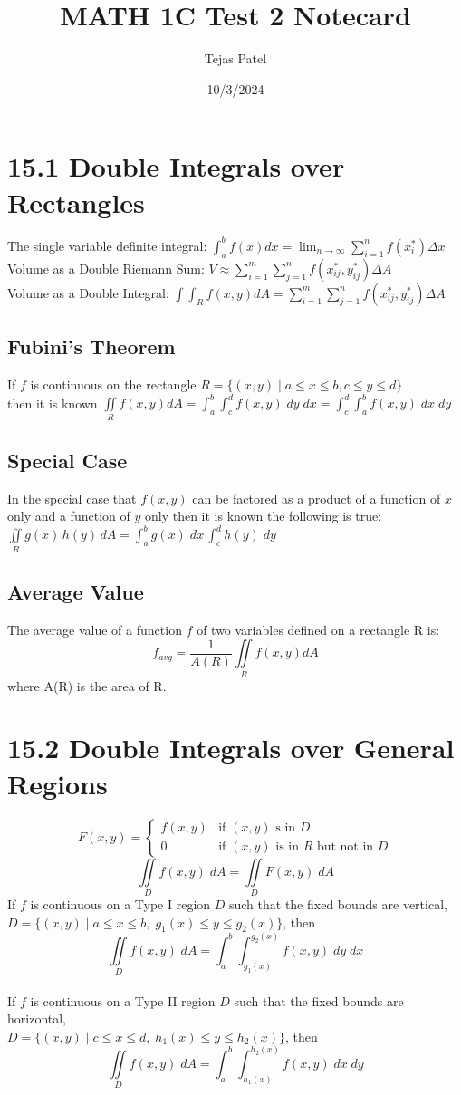 \documentclass{article}
\title{MATH 1C Test 2 Notecard}
\date{10/3/2024}
\author{Tejas Patel}
\begin{document}
\maketitle
\section*{15.1 Double Integrals over Rectangles}
The single variable definite integral: $\int_{a}^{b} f(x) dx = \lim_{n\to\infty} \sum_{i=1}^{n} f(x^*_i) \Delta x$
\\ Volume as a Double Riemann Sum: $V \approx \sum_{i=1}^{m}\sum_{j=1}^{n} f(x^*_{ij}, y^*_{ij}) \Delta A$
\\ Volume as a Double Integral: $\int\int_{R}f(x,y) dA = \sum_{i=1}^{m}\sum_{j=1}^{n} f(x^*_{ij}, y^*_{ij}) \Delta A$
\subsection*{Fubini's Theorem}
If $f$ is continuous on the rectangle $R=\{(x,y) \; | \; a \leq x \leq b,c\leq y \leq d\}$
\\[0.1in]then it is known $\iint\limits_{R} f(x,y)dA = \int_{a}^{b}\int_{c}^{d}f(x,y)\; dy \; dx = \int_{c}^{d}\int_{a}^{b} f(x,y) \; dx \; dy$
\subsection*{Special Case}
In the special case that $f(x,y)$ can be factored as a product of a function of $x$ only and a function of $y$ only then it is known the following is true:
\\[0.1in] $\iint\limits_{R} g(x)\,h(y)\,dA =\int_{a}^{b}g(x)\; dx\, \int_{c}^{d} h(y)\; dy$
\subsection*{Average Value}
The average value of a function $f$ of two variables defined on a rectangle R is:
\\$$ f_{avg}=\frac{1}{A(R)} \iint\limits_{R} f(x,y)dA$$ where A(R) is the area of R.
\pagebreak
\section*{15.2 Double Integrals over General Regions}
$$
F(x,y)=\begin{cases}
			f(x,y) & \text{if $(x,y)$ s in }D\\
            0 & \text{if $(x,y)$ is in $R$ but not in }D
		 \end{cases}
$$
$$\iint\limits_{D} f(x,y)\; dA =\iint\limits_{D} F(x,y)\; dA $$
If $f$ is continuous on a Type I region $D$ such that the fixed bounds are vertical, \\$D=\{(x,y)\; | \; a\leq x \leq b,\; g_1(x)\leq y \leq g_2(x)\}$, then 
$$\iint\limits_{D} f(x,y) \; dA = \int_{a}^{b} \int_{g_1(x)}^{g_2(x)} f(x,y) \; dy \; dx$$
\\If $f$ is continuous on a Type II region $D$ such that the fixed bounds are horizontal, \\$D=\{(x,y)\; | \; c\leq x \leq d,\; h_1(x)\leq y \leq h_2(x)\}$, then 
$$\iint\limits_{D} f(x,y) \; dA = \int_{a}^{b} \int_{h_1(x)}^{h_2(x)} f(x,y) \; dx \; dy$$
\end{document}
